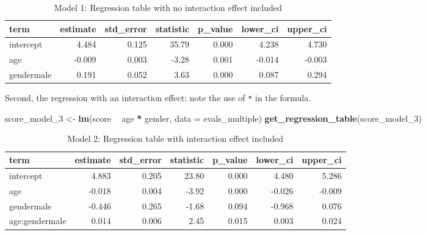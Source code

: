 \documentclass[12pt,]{krantz}
\makeatletter
\newenvironment{Shaded}{\begin{snugshade}}{\end{snugshade}}
\newcommand{\KeywordTok}[1]{\textcolor[rgb]{0.27,0.27,0.27}{\textbf{#1}}}
\newcommand{\DataTypeTok}[1]{\textcolor[rgb]{0.27,0.27,0.27}{#1}}
\newcommand{\DecValTok}[1]{\textcolor[rgb]{0.06,0.06,0.06}{#1}}
\newcommand{\StringTok}[1]{\textcolor[rgb]{0.5,0.5,0.5}{#1}}
\newcommand{\OperatorTok}[1]{\textcolor[rgb]{0.43,0.43,0.43}{\textbf{#1}}}
\newcommand{\NormalTok}[1]{#1}
\newenvironment{kframe}{%
\medskip{}
\setlength{\fboxsep}{.8em}
 \def\at@end@of@kframe{}%
 \ifinner\ifhmode%
  \def\at@end@of@kframe{\end{minipage}}%
  \begin{minipage}{\columnwidth}%
 \fi\fi%
 \def\FrameCommand##1{\hskip\@totalleftmargin \hskip-\fboxsep
 \colorbox{shadecolor}{##1}\hskip-\fboxsep
     \hskip-\linewidth \hskip-\@totalleftmargin \hskip\columnwidth}%
 \MakeFramed {\advance\hsize-\width
   \@totalleftmargin\z@ \linewidth\hsize
   \@setminipage}}%
 {\par\unskip\endMakeFramed%
 \at@end@of@kframe}
\renewenvironment{Shaded}{\begin{kframe}}{\end{kframe}}
\theoremstyle{definition}
\theoremstyle{definition}
\theoremstyle{definition}
\theoremstyle{remark}
\makeatother
\begin{document}
\begin{table}[H]

\caption{\label{tab:modelmultireg}Model 1: Regression table with no interaction effect included}
\centering
\fontsize{10}{12}\selectfont
\begin{tabular}[t]{lrrrrrr}
\toprule
term & estimate & std\_error & statistic & p\_value & lower\_ci & upper\_ci\\
\midrule
intercept & 4.484 & 0.125 & 35.79 & 0.000 & 4.238 & 4.730\\
age & -0.009 & 0.003 & -3.28 & 0.001 & -0.014 & -0.003\\
gendermale & 0.191 & 0.052 & 3.63 & 0.000 & 0.087 & 0.294\\
\bottomrule
\end{tabular}
\end{table}

Second, the regression with an interaction effect: note the use of
\texttt{*} in the formula.

\begin{Shaded}
\begin{Highlighting}[]
\NormalTok{score_model_}\DecValTok{3}\NormalTok{ <-}\StringTok{ }\KeywordTok{lm}\NormalTok{(score }\OperatorTok{~}\StringTok{ }\NormalTok{age }\OperatorTok{*}\StringTok{ }\NormalTok{gender, }\DataTypeTok{data =}\NormalTok{ evals_multiple)}
\KeywordTok{get_regression_table}\NormalTok{(score_model_}\DecValTok{3}\NormalTok{)}
\end{Highlighting}
\end{Shaded}

\begin{table}[H]

\caption{\label{tab:unnamed-chunk-434}Model 2: Regression table with interaction effect included}
\centering
\fontsize{10}{12}\selectfont
\begin{tabular}[t]{lrrrrrr}
\toprule
term & estimate & std\_error & statistic & p\_value & lower\_ci & upper\_ci\\
\midrule
intercept & 4.883 & 0.205 & 23.80 & 0.000 & 4.480 & 5.286\\
age & -0.018 & 0.004 & -3.92 & 0.000 & -0.026 & -0.009\\
gendermale & -0.446 & 0.265 & -1.68 & 0.094 & -0.968 & 0.076\\
age:gendermale & 0.014 & 0.006 & 2.45 & 0.015 & 0.003 & 0.024\\
\bottomrule
\end{tabular}
\end{table}
\end{document}
